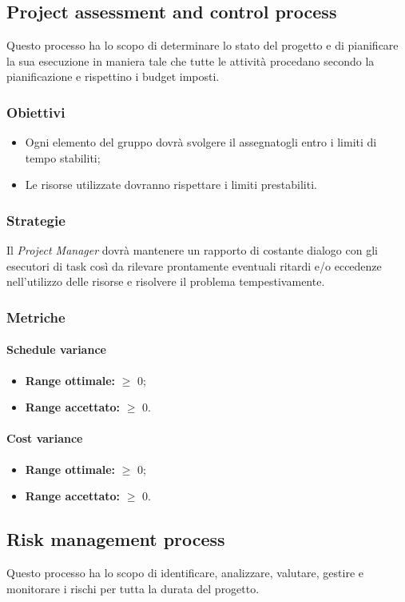 	\subsection{Project assessment and control process}
		Questo processo ha lo scopo di determinare lo stato del progetto e di pianificare la sua esecuzione in maniera tale che tutte le attività procedano secondo la pianificazione e rispettino i budget imposti.
		\subsubsection{Obiettivi}
			\begin{itemize}
				\item Ogni elemento del gruppo dovrà svolgere il  assegnatogli entro i limiti di tempo stabiliti;
				\item Le risorse utilizzate dovranno rispettare i limiti prestabiliti.
			\end{itemize}
	\subsubsection{Strategie}
	Il \emph{Project Manager} dovrà mantenere un rapporto di costante dialogo con gli esecutori di task così da rilevare prontamente eventuali ritardi e/o eccedenze nell'utilizzo delle risorse e risolvere il problema tempestivamente.
	\subsubsection{Metriche}
		\paragraph{Schedule variance} \Spazio
		\begin{itemize}
			\item \textbf{Range ottimale: }$\geq$ 0;
			\item \textbf{Range accettato: }$\geq$ 0.
		\end{itemize}
		\paragraph{Cost variance} \Spazio
		\begin{itemize}
			\item \textbf{Range ottimale: }$\geq$ 0;
			\item \textbf{Range accettato: }$\geq$ 0.
		\end{itemize}

	\subsection{Risk management process}
Questo processo ha lo scopo di identificare, analizzare, valutare, gestire e monitorare i rischi per tutta la durata del progetto.
